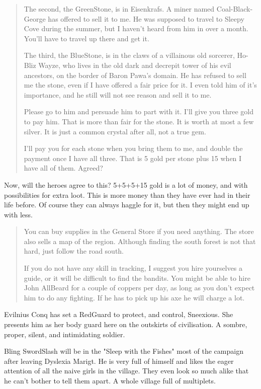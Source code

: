 \documentclass[11pt, twoside, titlepage, a4paper]{report}
\newenvironment{readoutloud}%
{\begin{quote}\begin{itshape}}%
{\end{itshape}\end{quote}}%
\begin{document}
\begin{readoutloud}
The second, the GreenStone, is in Eisenkrafs. A miner named Coal-Black-George has offered to sell it to me. He was supposed to travel to Sleepy Cove during the summer, but I haven't heard from him in over a month. You'll have to travel up there and get it.

The third, the BlueStone, is in the claws of a villainous old sorcerer, Ho-Bliz Wayze, who lives in the old dark and decrepit tower of his evil ancestors, on the border of Baron Pawa's domain. He has refused to sell me the stone, even if I have offered a fair price for it. I even told him of it's importance, and he still will not see reason and sell it to me.

Please go to him and persuade him to part with it. I'll give you three gold to pay him. That is more than fair for the stone. It is worth at most a few silver. It is just a common crystal after all, not a true gem.

I'll pay you for each stone when you bring them to me, and double the payment once I have all three. That is 5 gold per stone plus 15 when I have all of them. Agreed?
\end{readoutloud}


Now, will the heroes agree to this? 5+5+5+15 gold is a lot of money, and with possibilities for extra loot. This is more money than they have ever had in their life before.
Of course they can always haggle for it, but then they might end up with less.


\begin{readoutloud}
You can buy supplies in the General Store if you need anything. The store also sells a map of the region. Although finding the south forest is not that hard, just follow the road south.

If you do not have any skill in tracking, I suggest you hire yourselves a guide, or it will be difficult to find the bandits. You might be able to hire John AllBeard for a couple of coppers per day, as long as you don't expect him to do any fighting. If he has to pick up his axe he will charge a lot.
\end{readoutloud}


Evilnius Conq has set a RedGuard to protect, and control, Sneexious. She presents him as her body guard here on the outskirts of civilisation. A sombre, proper, silent, and intimidating soldier.


Bling SwordSlash will be in the "Sleep with the Fishes" most of the campaign after leaving Dyslexia Marigt. He is very full of himself and likes the eager attention of all the naive girls in the village. They even look so much alike that he can't bother to tell them apart. A whole village full of multiplets.
\end{document}
